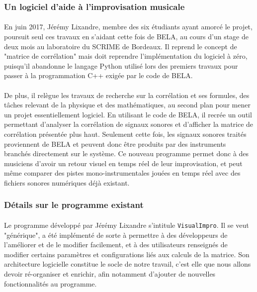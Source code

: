 \subsubsection{Un logiciel d'aide à l'improvisation musicale}
\paragraph{}
En juin 2017, Jérémy Lixandre, membre des six étudiants ayant amorcé
le projet, poursuit seul ces travaux en s'aidant cette fois de BELA,
au cours d'un stage de deux mois au laboratoire du SCRIME de
Bordeaux. Il reprend le concept de "matrice de corrélation" mais
doit reprendre l'implémentation du logiciel à zéro, puisqu'il
abandonne le langage Python utilisé lors des premiers travaux pour
passer à la programmation C++ exigée par le code de BELA.
\paragraph{}
De plus, il relègue les travaux de recherche sur la corrélation et ses
formules, des tâches relevant de la physique et des mathématiques, au
second plan pour mener un projet essentiellement logiciel. En
utilisant le code de BELA, il recrée un outil permettant d'analyser la
corrélation de signaux sonores et d'afficher la matrice de corrélation
présentée plus haut. Seulement cette fois, les signaux sonores traités
proviennent de BELA et peuvent donc être produits par des instruments
branchés directement sur le système. Ce nouveau programme permet donc
à des musiciens d'avoir un retour visuel en temps réel de leur
improvisation, et peut même comparer des pistes mono-instrumentales
jouées en temps réel avec des fichiers sonores numériques déjà
existant.

\subsubsection{Détails sur le programme existant}
\paragraph{}
Le programme développé par Jérémy Lixandre s'intitule
\verb!VisualImpro!. Il se veut "générique", a été implémenté de sorte
à permettre à des développeurs de l'améliorer et de le modifier
facilement, et à des utilisateurs renseignés de modifier certains
paramètres et configurations liés aux calculs de la matrice. Son
architecture logicielle constitue le socle de notre travail, c'est
elle que nous allons devoir ré-organiser et enrichir, afin notamment
d'ajouter de nouvelles fonctionnalités au programme.
